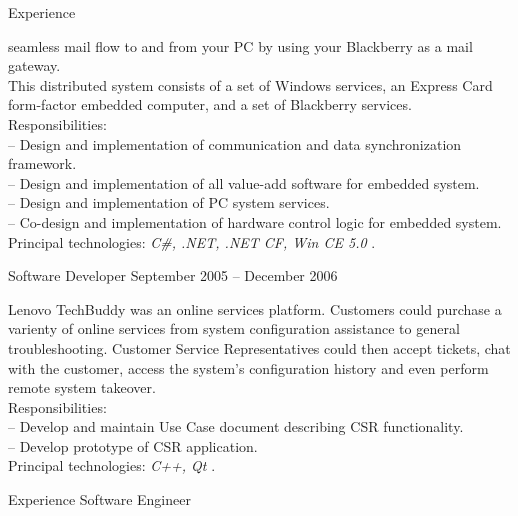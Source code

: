 \documentclass[letterpaper, 11pt]{article}
\begin{document}
\begin{resume}
\begin{category}{Experience}
\begin{block}
                seamless mail flow to and from your PC by using your Blackberry as a mail
                gateway.
                \\[1ex]
                This distributed system consists of a set of Windows services, an Express Card
                form-factor embedded computer, and a set of Blackberry services.
                \\[1ex]
                Responsibilities: \\
                -- Design and implementation of communication and data synchronization framework. \\
                -- Design and implementation of all value-add software for embedded system. \\
                -- Design and implementation of PC system services. \\
                -- Co-design and implementation of hardware control logic for embedded system.
                \\[1ex]
                Principal technologies: \emph{ C\#, .NET, .NET CF, Win CE 5.0 }.
            \end{block}
            \begin{block}
                 {Software Developer}
                         { }                {September 2005 -- December 2006}
                \par
                Lenovo TechBuddy was an online services platform.  Customers could purchase
                a varienty of online services from system configuration assistance to general
                troubleshooting.  Customer Service Representatives could then accept tickets,
                chat with the customer, access the system's configuration history and even
                perform remote system takeover.
                \\[1ex]
                Responsibilities: \\
                -- Develop and maintain Use Case document describing CSR functionality. \\
                -- Develop prototype of CSR application.
                \\[1ex]
                Principal technologies: \emph{ C++, Qt }.
            \end{block}
        \end{category}
        \begin{category}{Experience}
                                                         {Software Engineer}

\end{category}
\end{resume}
\end{document}
